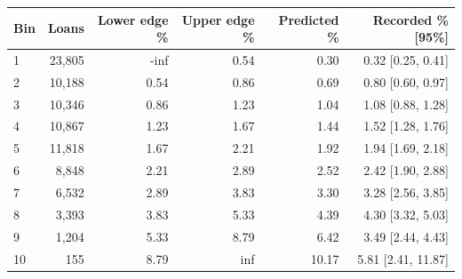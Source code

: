 \begingroup\small\setlength{\tabcolsep}{3pt}
\begin{tabularx}{\linewidth}{Xrrrrr}\toprule
Bin & Loans & Lower edge \% & Upper edge \% & Predicted \% & Recorded \% [95\%] \\ \midrule
1 & 23,805 & -inf & 0.54 & 0.30 & 0.32 [0.25, 0.41] \\
2 & 10,188 & 0.54 & 0.86 & 0.69 & 0.80 [0.60, 0.97] \\
3 & 10,346 & 0.86 & 1.23 & 1.04 & 1.08 [0.88, 1.28] \\
4 & 10,867 & 1.23 & 1.67 & 1.44 & 1.52 [1.28, 1.76] \\
5 & 11,818 & 1.67 & 2.21 & 1.92 & 1.94 [1.69, 2.18] \\
6 & 8,848 & 2.21 & 2.89 & 2.52 & 2.42 [1.90, 2.88] \\
7 & 6,532 & 2.89 & 3.83 & 3.30 & 3.28 [2.56, 3.85] \\
8 & 3,393 & 3.83 & 5.33 & 4.39 & 4.30 [3.32, 5.03] \\
9 & 1,204 & 5.33 & 8.79 & 6.42 & 3.49 [2.44, 4.43] \\
10 & 155 & 8.79 & inf & 10.17 & 5.81 [2.41, 11.87] \\
\bottomrule\end{tabularx}\endgroup
